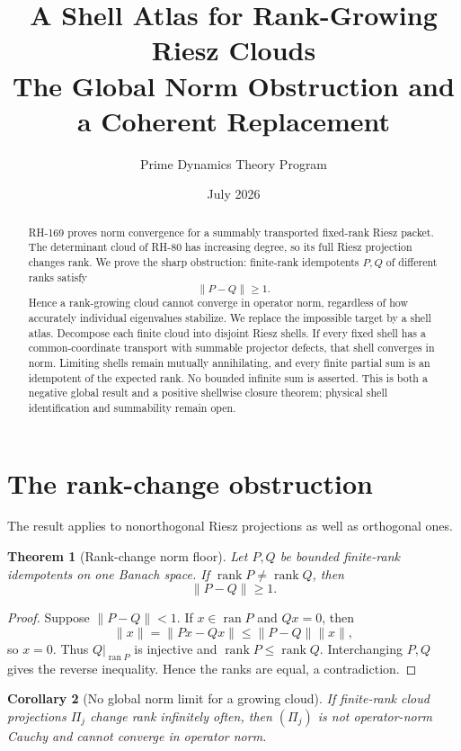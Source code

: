 \documentclass[12pt]{article}
\title{A Shell Atlas for Rank-Growing Riesz Clouds\\\large The Global Norm Obstruction and a Coherent Replacement}
\author{Prime Dynamics Theory Program}
\date{July 2026}
\newtheorem{theorem}{Theorem}
\newtheorem{corollary}[theorem]{Corollary}
\newcommand{\norm}[1]{\lVert#1\rVert}
\begin{document}
\maketitle
\begin{abstract}
RH-169 proves norm convergence for a summably transported fixed-rank Riesz
packet.  The determinant cloud of RH-80 has increasing degree, so its full
Riesz projection changes rank.  We prove the sharp obstruction: finite-rank
idempotents $P,Q$ of different ranks satisfy
\[
 \norm{P-Q}\ge1.
\]
Hence a rank-growing cloud cannot converge in operator norm, regardless of
how accurately individual eigenvalues stabilize.  We replace the impossible
target by a shell atlas.  Decompose each finite cloud into disjoint Riesz
shells.  If every fixed shell has a common-coordinate transport with
summable projector defects, that shell converges in norm.  Limiting shells
remain mutually annihilating, and every finite partial sum is an idempotent
of the expected rank.  No bounded infinite sum is asserted.  This is both a
negative global result and a positive shellwise closure theorem; physical
shell identification and summability remain open.
\end{abstract}

\section{The rank-change obstruction}
The result applies to nonorthogonal Riesz projections as well as orthogonal
ones.

\begin{theorem}[Rank-change norm floor]\label{thm:floor}
Let $P,Q$ be bounded finite-rank idempotents on one Banach space.  If
$\operatorname{rank}P\ne\operatorname{rank}Q$, then
\[
 \boxed{\ \norm{P-Q}\ge1.\ }
\]
\end{theorem}
\begin{proof}
Suppose $\norm{P-Q}<1$.  If $x\in\operatorname{ran}P$ and $Qx=0$, then
\[
 \norm x=\norm{Px-Qx}\le\norm{P-Q}\norm x,
\]
so $x=0$.  Thus $Q|_{\operatorname{ran}P}$ is injective and
$\operatorname{rank}P\le\operatorname{rank}Q$.  Interchanging $P,Q$ gives
the reverse inequality.  Hence the ranks are equal, a contradiction.
\end{proof}

\begin{corollary}[No global norm limit for a growing cloud]
If finite-rank cloud projections $\Pi_j$ change rank infinitely often, then
$(\Pi_j)$ is not operator-norm Cauchy and cannot converge in operator norm.
\end{corollary}
\end{document}
